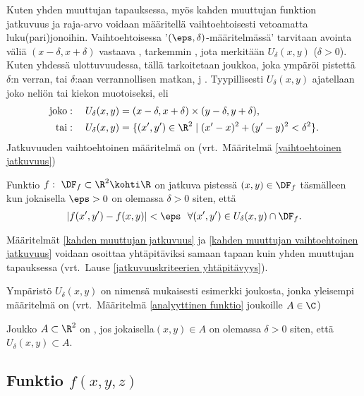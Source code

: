Kuten yhden muuttujan tapauksessa, myös kahden muuttujan funktion jatkuvuus ja raja-arvo
voidaan määritellä vaihtoehtoisesti vetoamatta luku(pari)jonoi\-hin. Vaihtoehtoisessa
'$(\eps,\delta)$-määritelmässä' tarvitaan avointa väliä $(x-\delta,x+\delta)$ vastaava
%
, tarkemmin , jota merkitään
$U_\delta(x,y)$ ($\delta>0$). Kuten yhdessä ulottuvuudessa, tällä tarkoitetaan joukkoa, joka
ympäröi pistettä $\delta$:n verran, tai $\delta$:aan verrannollisen matkan, j
. Tyypillisesti $U_\delta(x,y)$ ajatellaan joko neliön tai kiekon muotoiseksi,
eli
\begin{align*}
\text{joko}&: \quad U_\delta(x,y)=(x-\delta,x+\delta)\times(y-\delta,y+\delta), \\
 \text{tai}&: \quad U_\delta(x,y)=\{(x',y')\in\R^2 \mid (x'-x)^2+(y'-y)^2<\delta^2\}.
\end{align*}
Jatkuvuuden vaihtoehtoinen määritelmä on (vrt.\ Määritelmä \ref{vaihtoehtoinen jatkuvuus})
\begin{Def} \label{kahden muuttujan vaihtoehtoinen jatkuvuus}
Funktio $f:\ \DF_f\subset\R^2\kohti\R$ on jatkuva pistessä $(x,y)\in\DF_f$ täsmälleen kun
jokaisella $\eps>0$ on olemassa $\delta>0$ siten, että
\[
|f(x',y')-f(x,y)| < \eps\ \ \forall (x',y') \in U_\delta(x,y)\cap\DF_f.
\]
\end{Def}
Määritelmät \ref{kahden muuttujan jatkuvuus} ja \ref{kahden muuttujan vaihtoehtoinen jatkuvuus}
voidaan osoittaa yhtäpitäviksi samaan tapaan kuin yhden muuttujan tapauksessa (vrt.\ Lause
\ref{jatkuvuuskriteerien yhtäpitävyys}).

Ympäristö $U_\delta(x,y)$ on nimensä mukaisesti esimerkki  joukosta, jonka
yleisempi määritelmä on (vrt.\ Määritelmä \ref{analyyttinen funktio} joukoille $A\in\C$)
\begin{Def} \label{avoin joukko}  
Joukko $A\subset\R^2$ on , jos jokaisella$(x,y) \in A$ on olemassa $\delta>0$ siten,
että $U_\delta(x,y) \subset A$.
\end{Def}
 
\subsection*{Funktio $f(x,y,z)$}


